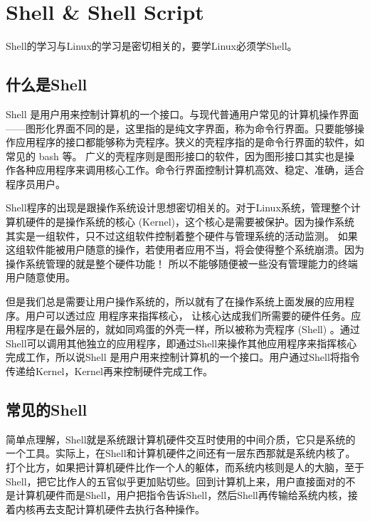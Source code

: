 \chapter{Shell \& Shell Script}
Shell的学习与Linux的学习是密切相关的，要学Linux必须学Shell。
\section{什么是Shell}
Shell 是用户用来控制计算机的一个接口。与现代普通用户常见的计算机操作界面——图形化界面不同的是，这里指的是纯文字界面，称为命令行界面。只要能够操作应用程序的接口都能够称为壳程序。狭义的壳程序指的是命令行界面的软件，如常见的 bash 等。 广义的壳程序则是图形接口的软件，因为图形接口其实也是操作各种应用程序来调用核心工作。命令行界面控制计算机高效、稳定、准确，适合程序员用户。

Shell程序的出现是跟操作系统设计思想密切相关的。对于Linux系统，管理整个计算机硬件的是操作系统的核心 (Kernel)，这个核心是需要被保护。因为操作系统其实是一组软件，只不过这组软件控制着整个硬件与管理系统的活动监测。 如果这组软件能被用户随意的操作，若使用者应用不当，将会使得整个系统崩溃。因为操作系统管理的就是整个硬件功能！ 所以不能够随便被一些没有管理能力的终端用户随意使用。

但是我们总是需要让用户操作系统的，所以就有了在操作系统上面发展的应用程序。用户可以透过应
用程序来指挥核心， 让核心达成我们所需要的硬件任务。应用程序是在最外层的，就如同鸡蛋的外壳一样，所以被称为壳程序 (Shell) 。通过Shell可以调用其他独立的应用程序，即通过Shell来操作其他应用程序来指挥核心完成工作，所以说Shell 是用户用来控制计算机的一个接口。用户通过Shell将指令传递给Kernel，Kernel再来控制硬件完成工作。



\section{常见的Shell}
简单点理解，Shell就是系统跟计算机硬件交互时使用的中间介质，它只是系统的一个工具。实际上，在Shell和计算机硬件之间还有一层东西那就是系统内核了。打个比方，如果把计算机硬件比作一个人的躯体，而系统内核则是人的大脑，至于Shell，把它比作人的五官似乎更加贴切些。回到计算机上来，用户直接面对的不是计算机硬件而是Shell，用户把指令告诉Shell，然后Shell再传输给系统内核，接着内核再去支配计算机硬件去执行各种操作。

